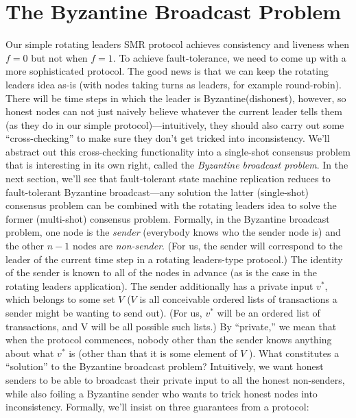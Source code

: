 \section{The Byzantine Broadcast Problem}
Our simple rotating leaders SMR protocol achieves consistency and liveness when $f = 0$ but
not when $f = 1$. To achieve fault-tolerance, we need to come up with a more sophisticated
protocol. The good news is that we can keep the rotating leaders idea as-is (with nodes
taking turns as leaders, for example round-robin). There will be time steps in which the
leader is Byzantine(dishonest), however, so honest nodes can not just naively believe whatever the
current leader tells them (as they do in our simple protocol)—intuitively, they should also
carry out some “cross-checking” to make sure they don’t get tricked into inconsistency. We’ll
abstract out this cross-checking functionality into a single-shot consensus problem that is
interesting in its own right, called the \textit{Byzantine broadcast problem}. In the next section,
we’ll see that fault-tolerant state machine replication reduces to fault-tolerant Byzantine
broadcast—any solution the latter (single-shot) consensus problem can be combined with
the rotating leaders idea to solve the former (multi-shot) consensus problem.
Formally, in the Byzantine broadcast problem, one node is the \textit{sender} (everybody knows who the sender node is) and the other $n−1$
nodes are \textit{non-sender}. (For us, the sender will correspond to the leader of the current time
step in a rotating leaders-type protocol.) The identity of the sender is known to all of the
nodes in advance (as is the case in the rotating leaders application). The sender additionally
has a private input $v^*$, which belongs to some set $V$ ($V$ is all conceivable ordered lists of transactions a sender might be wanting to send out).
(For us, $v^*$ will be an ordered list of
transactions, and V will be all possible such lists.) By “private,” we mean that when the
protocol commences, nobody other than the sender knows anything about what $v^*$ is (other
than that it is some element of $V$ ).
What constitutes a “solution” to the Byzantine broadcast problem? Intuitively, we want
honest senders to be able to broadcast their private input to all the honest non-senders,
while also foiling a Byzantine sender who wants to trick honest nodes into inconsistency.
Formally, we’ll insist on three guarantees from a protocol:\\

